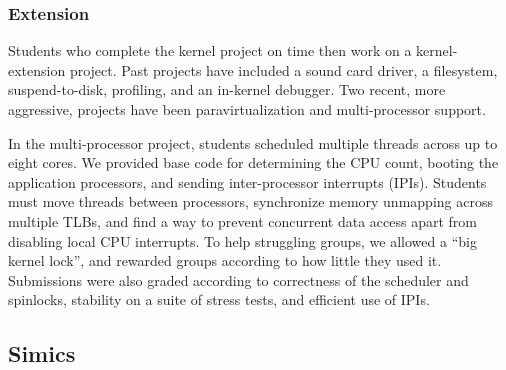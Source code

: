 \subsubsection{\pebbles Extension}

Students who complete the kernel project on time
then work on a kernel-extension project.
Past projects have included
a sound card driver,
a filesystem,
suspend-to-disk,
profiling,
and an in-kernel debugger.
Two recent, more aggressive, projects have been
paravirtualization
and multi-processor support.

In the multi-processor project, students
scheduled multiple threads across up to eight cores.
We provided base code for determining the CPU count, booting the application processors, and sending inter-processor interrupts (IPIs).
Students must move threads between processors,
synchronize memory unmapping across multiple TLBs,
and find a way to prevent concurrent data access apart from disabling local CPU interrupts.
%
To help struggling groups,
we allowed
a ``big kernel lock'', and rewarded groups according to how little they used it.
Submissions were also graded according to
correctness of the scheduler and spinlocks,
stability on a suite of stress tests,
and efficient use of IPIs. %


\subsection{Simics}
\label{sec:simics}

